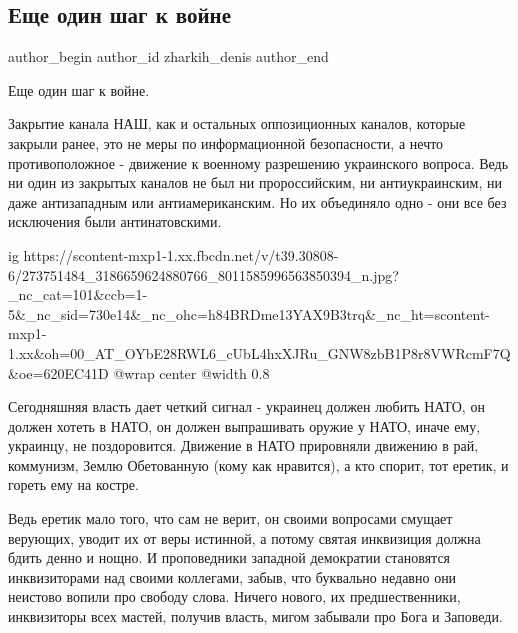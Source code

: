  
 
 
 
 
 
\subsection{Еще один шаг к войне}
\label{sec:12_02_2022.fb.zharkih_denis.1.esche_odin_shag_k_vojne}
 
\ifcmt
 author_begin
   author_id zharkih_denis
 author_end
\fi

Еще один шаг к войне.

Закрытие канала НАШ, как и остальных оппозиционных каналов, которые закрыли
ранее, это не меры по информационной безопасности, а нечто противоположное -
движение к военному разрешению украинского вопроса. Ведь ни один из закрытых
каналов не был ни пророссийским, ни антиукраинским, ни даже антизападным или
антиамериканским. Но их объединяло одно - они все без исключения были
антинатовскими. 

\ifcmt
  ig https://scontent-mxp1-1.xx.fbcdn.net/v/t39.30808-6/273751484_3186659624880766_8011585996563850394_n.jpg?_nc_cat=101&ccb=1-5&_nc_sid=730e14&_nc_ohc=h84BRDme13YAX9B3trq&_nc_ht=scontent-mxp1-1.xx&oh=00_AT_OYbE28RWL6_cUbL4hxXJRu_GNW8zbB1P8r8VWRcmF7Q&oe=620EC41D
  @wrap center
  @width 0.8
\fi

Сегодняшняя власть дает четкий сигнал - украинец должен любить НАТО, он должен
хотеть в НАТО, он должен выпрашивать оружие у НАТО, иначе ему, украинцу, не
поздоровится. Движение в НАТО прировняли движению в рай, коммунизм, Землю
Обетованную (кому как нравится), а кто спорит, тот еретик, и гореть ему на
костре. 

Ведь еретик мало того, что сам не верит, он своими вопросами смущает верующих,
уводит их от веры истинной, а потому святая инквизиция должна бдить денно и
нощно. И проповедники западной демократии становятся инквизиторами над своими
коллегами, забыв, что буквально недавно они неистово вопили про свободу слова.
Ничего нового, их предшественники, инквизиторы всех мастей, получив власть,
мигом забывали про Бога и Заповеди. 


